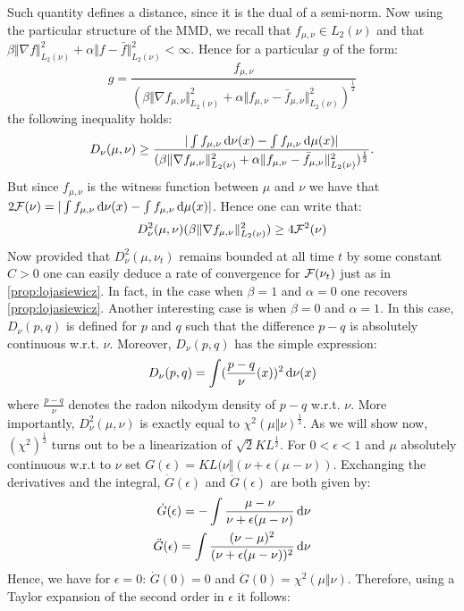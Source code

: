 Such quantity defines a distance, since it is the dual of a semi-norm. Now using the particular structure of the MMD, we recall that $f_{\mu,\nu}\in L_2(\nu)$ and that $\beta \Vert \nabla f \Vert^2_{L_2(\nu)} +\alpha  \Vert f- \bar{f}  \Vert^2_{L_2(\nu)}<\infty$. Hence for a particular $g$ of the form:
\[
g = \frac{f_{\mu,\nu}}{(\beta \Vert \nabla f_{\mu,\nu} \Vert^2_{L_2(\nu)} +\alpha  \Vert f_{\mu,\nu}- \bar{f}_{\mu,\nu}  \Vert^2_{L_2(\nu)} )^\frac{1}{2}}
\]
the following inequality holds:
\[
D_{\nu}(\mu,\nu) \geq \frac{\vert \int f_{\mu,\nu} \mathop{}\!\mathrm{d} \nu(x) -   \int f_{\mu,\nu} \mathop{}\!\mathrm{d}\mu(x)\vert }{(\beta \Vert \nabla f_{\mu,\nu} \Vert^2_{L_2(\nu)} +\alpha  \Vert f_{\mu,\nu}- \bar{f}_{\mu,\nu}  \Vert^2_{L_2(\nu)})^{\frac{1}{2}} }.
\]
But since $f_{\mu,\nu}$ is the witness function between $\mu$ and $\nu$ we have that $2{{\mathcal F}}(\nu) = \vert \int f_{\mu,\nu} \mathop{}\!\mathrm{d} \nu(x) - \int f_{\mu,\nu} \mathop{}\!\mathrm{d} \mu(x)\vert $. Hence one can write that:
\begin{align}
	D^2_{\nu}(\mu,\nu)(\beta \Vert \nabla f_{\mu,\nu} \Vert^2_{L_2(\nu)} ) \geq 4{{\mathcal F}}^2(\nu)
\end{align}
Now provided that $D^2_{\nu}(\mu,\nu_t)$ remains bounded at all time $t$ by some constant $C>0$ one can easily deduce a rate of convergence for ${{\mathcal F}}(\nu_t)$ just as in \cref{prop:lojasiewicz}. In fact, in the case when $\beta = 1$ and $\alpha =0$ one recovers \cref{prop:lojasiewicz}. Another interesting case is when $\beta =0$ and $\alpha=1$. In this case, $D_{\nu}(p,q)$ is defined for $p$ and $q$ such that the difference $p-q$ is absolutely continuous w.r.t. $\nu$. Moreover, $D_{\nu}(p,q)$ has the simple expression:
\[
D_{\nu}(p,q) = \int (\frac{p-q }{\nu }(x))^2 \mathop{}\!\mathrm{d} \nu(x)
\] 
where $\frac{ p-q }{ \nu }$ denotes the radon nikodym density of $p-q$ w.r.t. 
$\nu$. More importantly, $D^2_{\nu}(\mu,\nu)$ is exactly equal to $\chi^2(\mu\Vert \nu)^{\frac{1}{2}}$. 
As we will show now, $(\chi^2)^{\frac{1}{2}}$ turns out to be a linearization of $\sqrt{2} KL^{\frac{1}{2}}$.
For $0<\epsilon< 1$ and $\mu$ absolutely continuous w.r.t to $\nu$ set $G(\epsilon) = KL(\nu \Vert (\nu+\epsilon(\mu-\nu) )$. Exchanging the derivatives and the integral, $\dot{G}(\epsilon)$ and $\ddot{G}(\epsilon)$ are both given by:
\begin{align*}
	\dot{G}(\epsilon) = -\int \frac{\mu-\nu}{\nu +\epsilon(\mu-\nu)}\mathop{}\!\mathrm{d} \nu\\
	\ddot{G}(\epsilon) = \int \frac{(\nu-\mu)^2}{(\nu+\epsilon(\mu-\nu))^2} \mathop{}\!\mathrm{d} \nu
\end{align*}
Hence, we have for $\epsilon=0$:  $\dot{G}(0) = 0$ and $\ddot{G}(0) = \chi^2(\mu\Vert \nu)$. Therefore, using a Taylor expansion of the second order in $\epsilon$ it follows:
